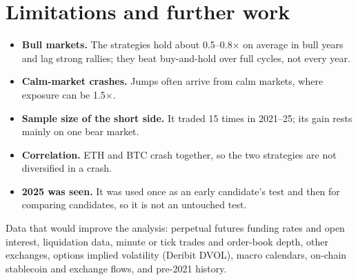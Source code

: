 \documentclass[11pt,a4paper]{article}
\theoremstyle{definition}
\begin{document}
\section{Limitations and further work}
\begin{itemize}
\item \textbf{Bull markets.} The strategies hold about 0.5--0.8$\times$ on average in bull years and lag strong rallies; they beat buy-and-hold over full cycles, not every year.
\item \textbf{Calm-market crashes.} Jumps often arrive from calm markets, where exposure can be 1.5$\times$.
\item \textbf{Sample size of the short side.} It traded 15 times in 2021--25; its gain rests mainly on one bear market.
\item \textbf{Correlation.} ETH and BTC crash together, so the two strategies are not diversified in a crash.
\item \textbf{2025 was seen.} It was used once as an early candidate's test and then for comparing candidates, so it is not an untouched test.
\end{itemize}
Data that would improve the analysis: perpetual futures funding rates and open interest, liquidation data, minute or tick trades and order-book depth, other exchanges, options implied volatility (Deribit DVOL), macro calendars, on-chain stablecoin and exchange flows, and pre-2021 history.

\end{document}
